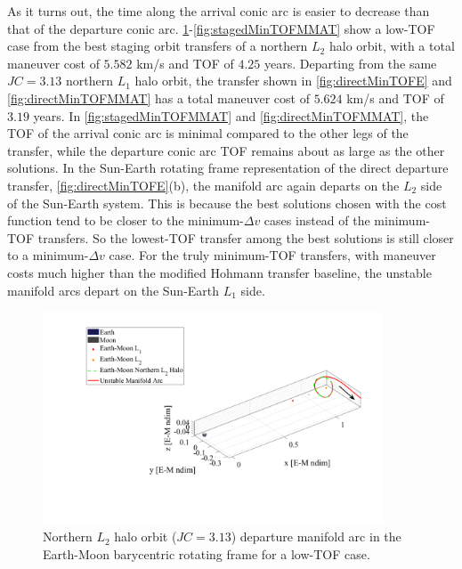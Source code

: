 As it turns out, the time along the arrival conic arc is easier to decrease than that of the
departure conic arc. \cref{fig:stagedMinTOFEM}-\cref{fig:stagedMinTOFMMAT} show a low-TOF case from
the best staging orbit transfers of a northern $L_{2}$ halo orbit, with a total maneuver cost of
$5.582$ km/s and TOF of $4.25$ years. Departing from the same $JC=3.13$ northern $L_{1}$ halo
orbit, the transfer shown in \cref{fig:directMinTOFE} and \cref{fig:directMinTOFMMAT} has a total
maneuver cost of $5.624$ km/s and TOF of $3.19$ years. In \cref{fig:stagedMinTOFMMAT} and
\cref{fig:directMinTOFMMAT}, the TOF of the arrival conic arc is minimal compared to the other legs
of the transfer, while the departure conic arc TOF remains about as large as the other solutions.
In the Sun-Earth rotating frame representation of the direct departure transfer,
\cref{fig:directMinTOFE}(b), the manifold arc again departs on the $L_{2}$ side of the Sun-Earth
system. This is because the best solutions chosen with the cost function tend to be closer to the
minimum-$\Delta v$ cases instead of the minimum-TOF transfers. So the lowest-TOF transfer among the
best solutions is still closer to a minimum-$\Delta v$ case. For the truly minimum-TOF transfers,
with maneuver costs much higher than the modified Hohmann transfer baseline, the unstable manifold
arcs depart on the Sun-Earth $L_{1}$ side.

\begin{figure}[!htb]
    \centering
    \includegraphics[width=0.9\textwidth]{figures/StagedMinTOFEM.pdf}
    \caption{Northern $L_{2}$ halo orbit ($JC=3.13$) departure manifold arc in the Earth-Moon barycentric rotating frame for a low-TOF case.}
    \label{fig:stagedMinTOFEM}
\end{figure}

